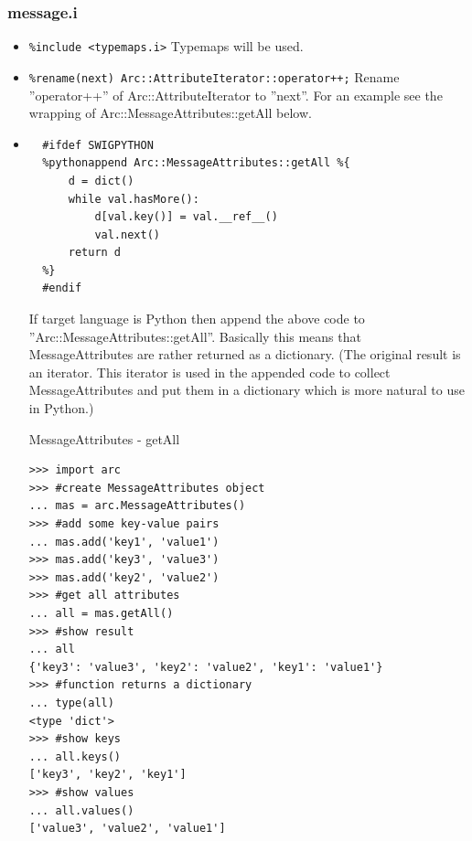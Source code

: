 \documentclass{article}
\begin{document}
\subsubsection{message.i}
\label{imessage}
\begin{flushleft}
\begin{itemize}
  \item{ \verb$%include <typemaps.i>$} \linebreak
  Typemaps will be used. 
\end{itemize}
\begin{itemize}
  \item{\verb$%rename(next) Arc::AttributeIterator::operator++;$ \linebreak
  Rename ''operator++'' of Arc::AttributeIterator to ''next''.
  For an example see the wrapping of Arc::MessageAttributes::getAll below. 
  }
\end{itemize}
\begin{itemize}
  \item{\begin{verbatim}
  #ifdef SWIGPYTHON
  %pythonappend Arc::MessageAttributes::getAll %{
      d = dict()
      while val.hasMore():
          d[val.key()] = val.__ref__()
          val.next()
      return d
  %}
  #endif\end{verbatim} 
  If target language is Python then append the above code to ''Arc::MessageAttributes::getAll''. 
  Basically this means that MessageAttributes are rather returned as a dictionary.
  (The original result is an iterator. This iterator is used in the appended code to collect 
   MessageAttributes and put them in a dictionary which is more natural to use in Python.)
    \begin{example}
      \caption{MessageAttributes - getAll}\label{msgattrex}
\begin{verbatim}
>>> import arc
>>> #create MessageAttributes object
... mas = arc.MessageAttributes()
>>> #add some key-value pairs
... mas.add('key1', 'value1')
>>> mas.add('key3', 'value3')
>>> mas.add('key2', 'value2')
>>> #get all attributes
... all = mas.getAll()
>>> #show result
... all
{'key3': 'value3', 'key2': 'value2', 'key1': 'value1'}
>>> #function returns a dictionary
... type(all)
<type 'dict'>
>>> #show keys
... all.keys()
['key3', 'key2', 'key1']
>>> #show values
... all.values()
['value3', 'value2', 'value1']
\end{verbatim}
    \end{example}
  }
\end{itemize}
\begin{itemize}

\end{itemize}
\end{flushleft}
\end{document}

